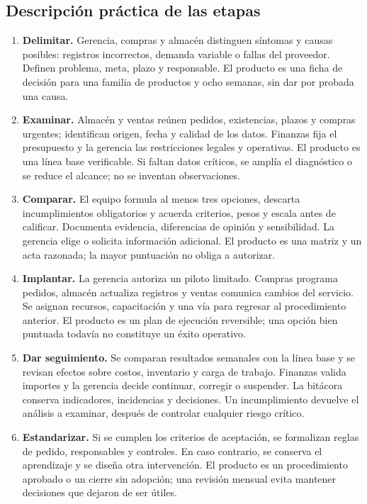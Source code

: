\documentclass[12pt,spanish,letterpaper,oneside]{article}
\begin{document}
\clearpage
\subsection{Descripción práctica de las etapas}
\begin{enumerate}
\item \textbf{Delimitar.} Gerencia, compras y almacén distinguen síntomas y
causas posibles: registros incorrectos, demanda variable o fallas del proveedor.
Definen problema, meta, plazo y responsable. El producto es una ficha de decisión
para una familia de productos y ocho semanas, sin dar por probada una causa.
\item \textbf{Examinar.} Almacén y ventas reúnen pedidos, existencias, plazos
y compras urgentes; identifican origen, fecha y calidad de los datos. Finanzas
fija el presupuesto y la gerencia las restricciones legales y operativas. El
producto es una línea base verificable. Si faltan datos críticos, se amplía
el diagnóstico o se reduce el alcance; no se inventan observaciones.
\item \textbf{Comparar.} El equipo formula al menos tres opciones, descarta
incumplimientos obligatorios y acuerda criterios, pesos y escala antes de
calificar. Documenta evidencia, diferencias de opinión y sensibilidad. La
gerencia elige o solicita información adicional. El producto es una matriz
y un acta razonada; la mayor puntuación no obliga a autorizar.
\item \textbf{Implantar.} La gerencia autoriza un piloto limitado. Compras
programa pedidos, almacén actualiza registros y ventas comunica cambios del
servicio. Se asignan recursos, capacitación y una vía para regresar al
procedimiento anterior. El producto es un plan de ejecución reversible;
una opción bien puntuada todavía no constituye un éxito operativo.
\item \textbf{Dar seguimiento.} Se comparan resultados semanales con la línea
base y se revisan efectos sobre costos, inventario y carga de trabajo.
Finanzas valida importes y la gerencia decide continuar, corregir o suspender.
La bitácora conserva indicadores, incidencias y decisiones. Un incumplimiento
devuelve el análisis a examinar, después de controlar cualquier riesgo crítico.
\item \textbf{Estandarizar.} Si se cumplen los criterios de aceptación, se
formalizan reglas de pedido, responsables y controles. En caso contrario,
se conserva el aprendizaje y se diseña otra intervención. El producto es un
procedimiento aprobado o un cierre sin adopción; una revisión mensual evita
mantener decisiones que dejaron de ser útiles.
\end{enumerate}
\end{document}
